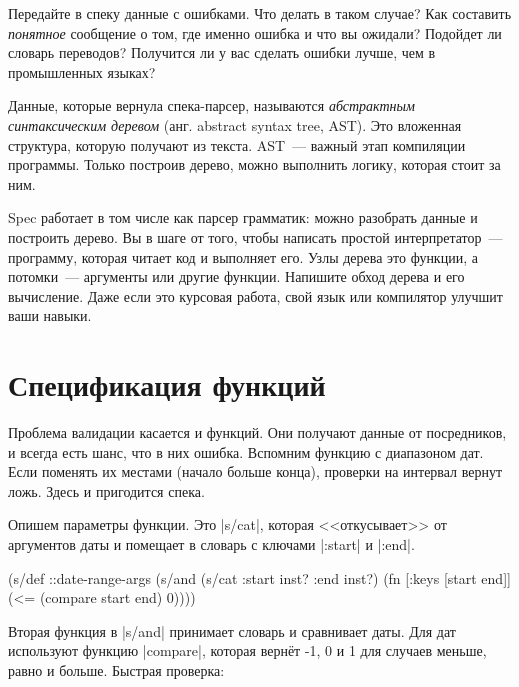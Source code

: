 Передайте в спеку данные с ошибками. Что делать в таком случае? Как составить
\emph{понятное} сообщение о том, где именно ошибка и что вы ожидали? Подойдет ли
словарь переводов? Получится ли у вас сделать ошибки лучше, чем в промышленных
языках?

Данные, которые вернула спека-парсер, называются
\emph{абстрактным синтаксическим деревом}
(анг. abstract syntax tree, AST). Это вложенная структура, которую получают из
текста. AST~--- важный этап компиляции программы. Только построив дерево, можно
выполнить логику, которая стоит за ним.


Spec работает в том числе как парсер грамматик: можно разобрать данные и
построить дерево. Вы в шаге от того, чтобы написать простой интерпретатор~---
программу, которая читает код и выполняет его. Узлы дерева это функции, а
потомки~--- аргументы или другие функции. Напишите обход дерева и его
вычисление. Даже если это курсовая работа, свой язык или компилятор улучшит ваши
навыки.

\section{Спецификация функций}


Проблема валидации касается и функций. Они получают данные от посредников, и
всегда есть шанс, что в них ошибка. Вспомним функцию с диапазоном дат. Если
поменять их местами (начало больше конца), проверки на интервал вернут
ложь. Здесь и пригодится спека.

Опишем параметры функции. Это \spverb|s/cat|, которая <<откусывает>> от
аргументов даты и помещает в словарь с ключами \spverb|:start| и \spverb|:end|.

\begin{english}
  \begin{clojure}
(s/def ::date-range-args
  (s/and
   (s/cat :start inst? :end inst?)
   (fn [{:keys [start end]}]
     (<= (compare start end) 0))))
  \end{clojure}
\end{english}


Вторая функция в \spverb|s/and| принимает словарь и сравнивает даты. Для дат
используют функцию \spverb|compare|, которая верн\"{е}т -1, 0 и 1 для случаев
меньше, равно и больше. Быстрая проверка:

